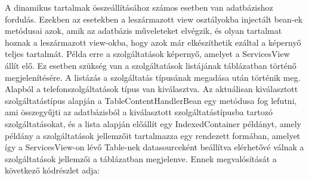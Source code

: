 \documentclass[centeredchapter]{thesis-ekf}
\theoremstyle{definition}
\theoremstyle{remark}
\begin{document}
A dinamikus tartalmak összeállításához számos esetben van adatbázishoz fordulás. Ezekben az esetekben a leszármazott view osztályokba injectált bean-ek metódusai azok, amik az adatbázis műveleteket elvégzik, és olyan tartalmat hoznak a leszármazott view-okba, hogy azok már elkészíthetik ezáltal a képernyő teljes tartalmát. Példa erre a szolgáltatások képernyő, amelyet a ServicesView állít elő. Ez esetben szükség van a szolgáltatások listájának táblázatban történő megjelenítésére.
A listázás a szolgáltatás típusának megadása után történik meg. Alapból a telefonszolgáltatások típus van kiválasztva. Az aktuálisan kiválasztott szolgáltatástípus alapján a TableContentHandlerBean egy metódusa fog lefutni, ami összegyűjti az adatbázisból a kiválasztott szolgáltatástípusba tartozó szolgáltatásokat, és a lista alapján előállít egy IndexedContainer példányt, amely példány a szolgáltatások jellemzőit tartalmazza egy rendezett formában, amelyet így a ServicesView-on lévő Table-nek datasourceként beállítva elérhetővé válnak a szolgáltatások jellemzői a táblázatban megjelenve.
Ennek megvalósítását a következő kódrészlet adja:


\end{document}
